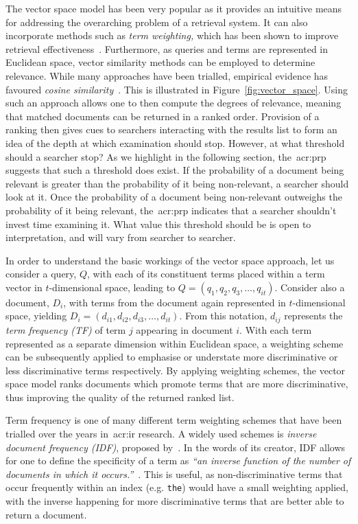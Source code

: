 The vector space model has been very popular as it provides an intuitive means for addressing the overarching problem of a retrieval system. It can also incorporate methods such as \emph{term weighting,} which has been shown to improve retrieval effectiveness~\citep{croft2009search}. Furthermore, as queries and terms are represented in Euclidean space, vector similarity methods can be employed to determine relevance. While many approaches have been trialled, empirical evidence has favoured \emph{cosine similarity}~\citep{croft2009search}. This is illustrated in Figure~\ref{fig:vector_space}. Using such an approach allows one to then compute the degrees of relevance, meaning that matched documents can be returned in a ranked order. Provision of a ranking then gives cues to searchers interacting with the results list to form an idea of the depth at which examination should stop. However, at what threshold should a searcher stop? As we highlight in the following section, the~\gls{acr:prp}~\citep{robertson1977prp} suggests that such a threshold does exist. If the probability of a document being relevant is greater than the probability of it being non-relevant, a searcher should look at it. Once the probability of a document being non-relevant outweighs the probability of it being relevant, the~\gls{acr:prp} indicates that a searcher shouldn't invest time examining it. What value this threshold should be is open to interpretation, and will vary from searcher to searcher.

In order to understand the basic workings of the vector space approach, let us consider a query, $Q$, with each of its constituent terms placed within a term vector in $t$-dimensional space, leading to $Q = (q_1, q_2, q_3,\dotsc, q_{it})$. Consider also a document, $D_i$, with terms from the document again represented in $t$-dimensional space, yielding $D_i = (d_{i1}, d_{i2}, d_{i3},\dotsc, d_{it})$. From this notation, $d_{ij}$ represents the \emph{term frequency (TF)} of term $j$ appearing in document $i$. With each term represented as a separate dimension within Euclidean space, a weighting scheme can be subsequently applied to emphasise or understate more discriminative or less discriminative terms respectively. By applying weighting schemes, the vector space model ranks documents which promote terms that are more discriminative, thus improving the quality of the returned ranked list.

Term frequency is one of many different term weighting schemes that have been trialled over the years in~\gls{acr:ir} research. A widely used schemes is \emph{inverse document frequency (IDF)}, proposed by~\cite{sparck1972statistical}. In the words of its creator, IDF allows for one to define the specificity of a term as \emph{``an inverse function of the number of documents in which it occurs.''}~\citep{sparck1972statistical}. This is useful, as non-discriminative terms that occur frequently within an index (e.g. \texttt{the}) would have a small weighting applied, with the inverse happening for more discriminative terms that are better able to return a document.

